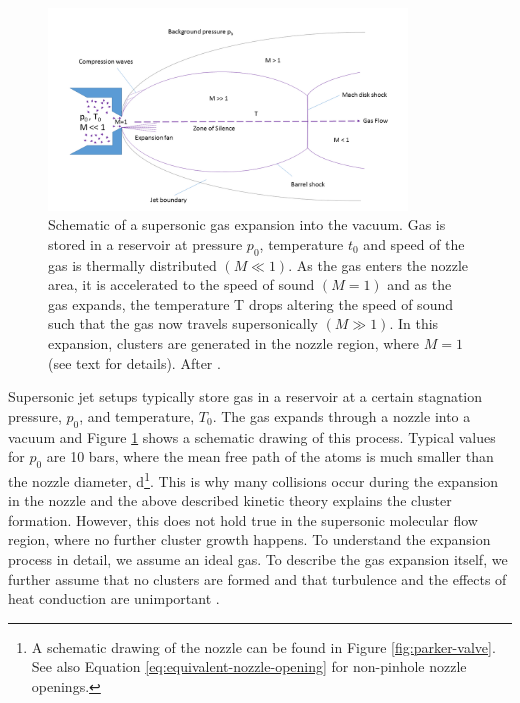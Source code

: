 %
\begin{figure}
	\centering
		\includegraphics[width=0.85\textwidth]{images/freeJetExpansion.png}
	\caption[Schematic of a supersonic gas expansion into a vacuum.]{Schematic of a supersonic gas expansion into the vacuum. Gas is stored in a reservoir at pressure $p_{0}$, temperature $t_{0}$ and speed of the gas is thermally distributed $\left(M\ll 1\right)$. As the gas enters the nozzle area, it is accelerated to the speed of sound $\left(M=1\right)$ and as the gas expands, the temperature T drops altering the speed of sound such that the gas now travels supersonically $\left(M\gg 1\right)$. In this expansion, clusters are generated in the nozzle region, where $M=1$ (see text for details). After \citep{Miller-1988-Oxford}.}
	\label{fig:freeJetExpansion}
\end{figure}
%
Supersonic jet setups typically store gas in a reservoir at a certain stagnation pressure, $p_{0}$, and temperature, $T_{0}$. The gas expands through a nozzle into a vacuum and Figure \ref{fig:freeJetExpansion} shows a schematic drawing of this process. Typical values for $p_{0}$ are 10 bars, where the mean free path of the atoms is much smaller than the nozzle diameter, d\footnote{A schematic drawing of the nozzle can be found in Figure \ref{fig:parker-valve}. See also Equation \eqref{eq:equivalent-nozzle-opening} for non-pinhole nozzle openings.}. This is why many collisions occur during the expansion in the nozzle and the above described kinetic theory explains the cluster formation. However, this does not hold true in the supersonic molecular flow region, where no further cluster growth happens. To understand the expansion process in detail, we assume an ideal gas. To describe the gas expansion itself, we further assume that no clusters are formed and that turbulence and the effects of heat conduction are unimportant \cite{Yamada-2001-SciDir,Haberland-1994-Springer}.\\[1\baselineskip]
